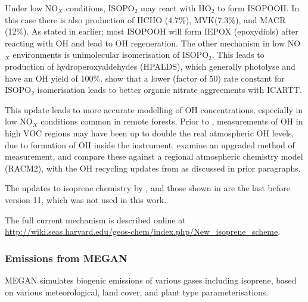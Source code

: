       Under low NO$_X$ conditions, ISOPO$_2$ may react with HO$_2$ to form ISOPOOH.
      In this case there is also production of HCHO (4.7\%), MVK(7.3\%), and MACR (12\%).
      As stated in earlier; most ISOPOOH will form IEPOX (epoxydiols) after reacting with OH and lead to OH regeneration.
      The other mechanism in low NO$_X$ environments is unimolecular isomerisation of ISOPO$_2$.
      This leads to production of hydroperoxyaldehydes (HPALDS), which generally photolyse and have an OH yield of 100\%.
      \citet{Mao2013} show that a lower (factor of 50) rate constant for ISOPO$_2$ isomerisation leads to better organic nitrate aggreements with ICARTT. 
      
      This update leads to more accurate modelling of OH concentrations, especially in low NO$_X$ conditions common in remote forests.
      Prior to \citet{Mao2012}, measurements of OH in high VOC regions may have been up to double the real atmospheric OH levels, due to formation of OH inside the instrument.
      \citet{Mao2012} examine an upgraded method of measurement, and compare these against a regional atmospheric chemistry model (RACM2), with the OH recycling updates from \citet{Paulot2009b} as discussed in prior paragraphs.
      
      The updates to isoprene chemistry by \citet{Mao2013}, and those shown in \cite{Crounse2011,Crounse2012} are the last before version 11, which was not used in this work.
      
      The full current mechanism is described online at \url{http://wiki.seas.harvard.edu/geos-chem/index.php/New_isoprene_scheme}.
    
    
    \subsubsection{Emissions from MEGAN}
      \label{Model:GC:Isop:MEGAN}
      MEGAN simulates biogenic emissions of various gases including isoprene, based on various meteorological, land cover, and plant type parameterisations.
      
